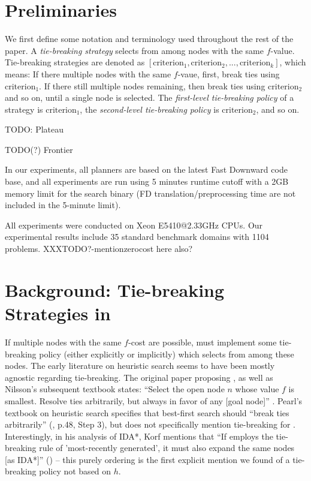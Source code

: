 \section{Preliminaries}

We first define some notation and terminology used throughout the rest of the paper.
A \emph{tie-breaking strategy} selects from among nodes with the same $f$-value.
Tie-breaking strategies are denoted as $[\text{criterion}_1, \text{criterion}_2, ..., \text{criterion}_k]$,
which means: If there multiple nodes with the same $f$-vaue, first, break ties using $\text{criterion}_1$. 
If there still multiple nodes remaining, then break ties using $\text{criterion}_2$ and so on, until a single node is selected.
The \emph{first-level tie-breaking policy} of a strategy is $\text{criterion}_1$, the \emph{second-level tie-breaking policy} is $\text{criterion}_2$, and so on.

TODO: Plateau

TODO(?) Frontier

In our experiments, all planners are based on the latest Fast Downward code base, and all
experiments are run using 5 minutes runtime cutoff with a 2GB memory 
limit for the search binary (FD translation/preprocessing time are not included in the 5-minute limit).

All experiments were conducted on Xeon E5410@2.33GHz CPUs.
Our experimental results include 35 standard benchmark domains with 1104
problems.
XXXTODO?-mentionzerocost here also? %

\section{Background: Tie-breaking Strategies in \astar}


If multiple nodes with the same $f$-cost are possible, \astar
must implement some tie-breaking policy (either
explicitly or implicitly) which selects from among these nodes.
The early literature on heuristic search seems to have been mostly agnostic regarding tie-breaking.
The original paper proposing \astar, as well as Nilsson's
subsequent textbook states: ``Select the open node $n$ whose value $f$
is smallest. Resolve ties arbitrarily, but always in favor of any [goal
node]'' \cite[p.102 Step 2]{hart1968formal} \cite[p.69]{Nilsson71}.
Pearl's textbook on heuristic search specifies that best-first search should ``break ties arbitrarily'' (\citeyear{pearl1984heuristics}, p.48, Step 3), but does not specifically mention tie-breaking for \astar.
Interestingly, in his analysis of IDA*, Korf mentions that ``If \astar employs the tie-breaking rule of 'most-recently generated', it must also expand the same nodes [as IDA*]'' (\citeyear{korf1985depth}) -- this purely \lifo ordering is the first explicit mention we found of a tie-breaking policy not based on $h$.

